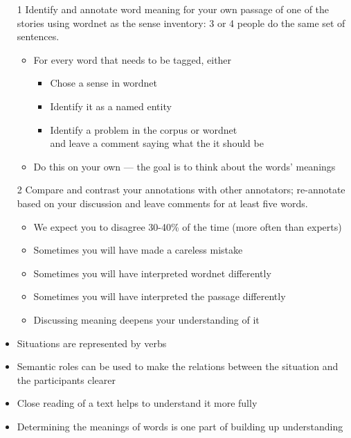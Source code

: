 \documentclass[a4paper,landscape,headrule,footrule,xetex]{foils}
\begin{document}
\begin{itemize}
\item[1] Identify and annotate word meaning for your own passage of
  one of the stories using wordnet as the sense inventory: 3 or 4 people do
  the same set of sentences.
  \begin{itemize}
  \item For every word that needs to be tagged, either
    \begin{itemize}
    \item Chose a sense in wordnet
    \item Identify it as a named entity
    \item Identify a problem in the corpus or wordnet
      \\ and leave a comment saying what the it should be
    \end{itemize}
  \item Do this on your own --- the goal is to think about the words' meanings
  \end{itemize}
\item[2] Compare and contrast your annotations with other annotators;
  re-annotate based on your discussion and leave comments for at least
  five words.
  \begin{itemize}
  \item We expect you to disagree 30-40\% of the time (more often than experts)
  \item Sometimes you will have made a careless mistake
  \item Sometimes you will have interpreted wordnet differently
  \item Sometimes you will have interpreted the passage differently
  \item Discussing meaning deepens your understanding of it
  \end{itemize}
\end{itemize}


\begin{itemize}
\item Situations are represented by verbs
\item Semantic roles can be used to make the relations between the situation and the participants clearer
\item Close reading of a text helps to understand it more fully
\item Determining the meanings of words is one part of building up
  understanding
\end{itemize}

\small


\end{document}
